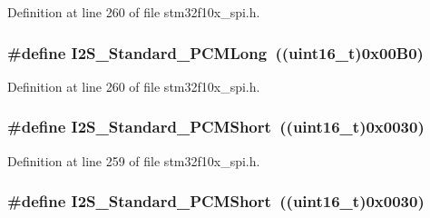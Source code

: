 Definition at line 260 of file stm32f10x\+\_\+spi.\+h.

\subsubsection[{\texorpdfstring{I2\+S\+\_\+\+Standard\+\_\+\+P\+C\+M\+Long}{I2S_Standard_PCMLong}}]{\setlength{\rightskip}{0pt plus 5cm}\#define I2\+S\+\_\+\+Standard\+\_\+\+P\+C\+M\+Long~(({\bf uint16\+\_\+t})0x00\+B0)}\hypertarget{group___i2_s___standard_gaf79cb88702059506d876dbd776d7a136}{}\label{group___i2_s___standard_gaf79cb88702059506d876dbd776d7a136}


Definition at line 260 of file stm32f10x\+\_\+spi.\+h.

\subsubsection[{\texorpdfstring{I2\+S\+\_\+\+Standard\+\_\+\+P\+C\+M\+Short}{I2S_Standard_PCMShort}}]{\setlength{\rightskip}{0pt plus 5cm}\#define I2\+S\+\_\+\+Standard\+\_\+\+P\+C\+M\+Short~(({\bf uint16\+\_\+t})0x0030)}\hypertarget{group___i2_s___standard_gaaf59e587048ff632037dfc9875ab4c7b}{}\label{group___i2_s___standard_gaaf59e587048ff632037dfc9875ab4c7b}


Definition at line 259 of file stm32f10x\+\_\+spi.\+h.

\subsubsection[{\texorpdfstring{I2\+S\+\_\+\+Standard\+\_\+\+P\+C\+M\+Short}{I2S_Standard_PCMShort}}]{\setlength{\rightskip}{0pt plus 5cm}\#define I2\+S\+\_\+\+Standard\+\_\+\+P\+C\+M\+Short~(({\bf uint16\+\_\+t})0x0030)}\hypertarget{group___i2_s___standard_gaaf59e587048ff632037dfc9875ab4c7b}{}\label{group___i2_s___standard_gaaf59e587048ff632037dfc9875ab4c7b}


